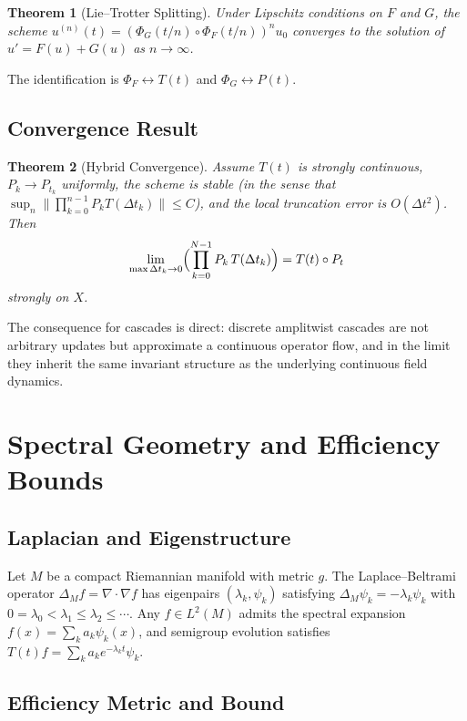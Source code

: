 \documentclass[12pt, a4paper]{article}
\newtheorem{theorem}{Theorem}[section]
\theoremstyle{remark}
\theoremstyle{definition}
\begin{document}
\begin{theorem}[Lie--Trotter Splitting]
Under Lipschitz conditions on $F$ and $G$, the scheme
$u^{(n)}(t) = (\Phi_G(t/n) \circ \Phi_F(t/n))^n u_0$
converges to the solution of $u' = F(u) + G(u)$ as $n \to \infty$.
\end{theorem}

The identification is $\Phi_F \leftrightarrow T(t)$ and $\Phi_G \leftrightarrow P(t)$.

\subsection{Convergence Result}

\begin{theorem}[Hybrid Convergence]
\label{thm:hybrid}
Assume $T(t)$ is strongly continuous, $P_k \to P_{t_k}$ uniformly, the scheme is stable
(in the sense that $\sup_n \|\prod_{k=0}^{n-1} P_k T(\Delta t_k)\| \le C$), and the local
truncation error is $O(\Delta t^2)$.  Then
\[
\lim_{\max\Delta t_k \to 0}
\Bigl(\prod_{k=0}^{N-1} P_k\,T(\Delta t_k)\Bigr)
= T(t)\circ P_t
\]
strongly on $X$.
\end{theorem}

The consequence for cascades is direct: discrete amplitwist cascades are not arbitrary
updates but approximate a continuous operator flow, and in the limit they inherit the same
invariant structure as the underlying continuous field dynamics.

\section{Spectral Geometry and Efficiency Bounds}
\label{app:spectral}

\subsection{Laplacian and Eigenstructure}

Let $M$ be a compact Riemannian manifold with metric $g$.  The Laplace--Beltrami operator
$\Delta_M f = \nabla \cdot \nabla f$ has eigenpairs $(\lambda_k, \psi_k)$ satisfying
$\Delta_M \psi_k = -\lambda_k \psi_k$ with $0 = \lambda_0 < \lambda_1 \le \lambda_2 \le
\cdots$.  Any $f \in L^2(M)$ admits the spectral expansion $f(x) = \sum_k a_k \psi_k(x)$,
and semigroup evolution satisfies $T(t)f = \sum_k a_k e^{-\lambda_k t}\psi_k$.

\subsection{Efficiency Metric and Bound}
\end{document}
